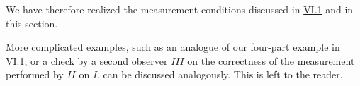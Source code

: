 \documentclass[fontsize=13pt,twoside,openany,headings=normal,parskip=false,bookmarkpackage=false,DIV=calc]{scrbook}
\begin{document}
We have therefore realized the measurement conditions discussed in \hyperref[sec:VI.1]{VI.1} and in this section.

More complicated examples, such as an analogue of our four-part example in \hyperref[sec:VI.1]{VI.1}, or a check by a second observer $III$ on the correctness of the measurement performed by $II$ on $I$, can be discussed analogously. This is left to the reader.


\end{document}
